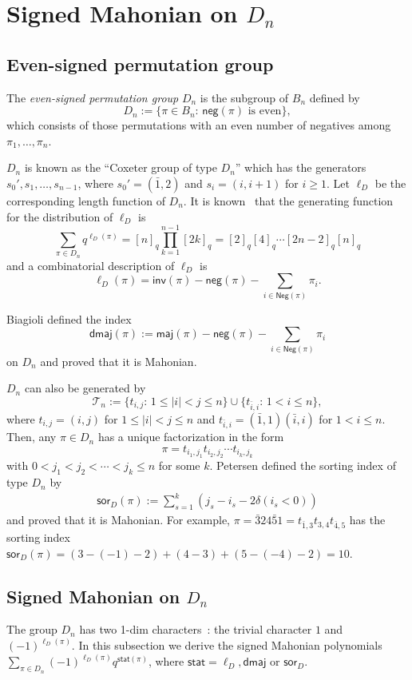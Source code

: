 \documentclass[a4paper, reqno, 11pt]{amsart}
\newcommand{\stat}{{\textsf{stat}}}
\newcommand{\maj}{{\textsf{maj}}}
\newcommand{\inv}{{\textsf{inv}}}
\newcommand{\Nega}{{\textsf{Neg}}}
\newcommand{\nega}{{\textsf{neg}}}
\newcommand{\dmaj}{{\textsf{dmaj}}}
\newcommand{\sor}{{\textsf{sor}}}
\numberwithin{equation}{section}
\begin{document}
\section{Signed Mahonian on $D_n$}\label{sec:Dn}

\subsection{Even-signed permutation group}\label{Sec:Dn_Dn}

The \emph{even-signed permutation group} $D_n$ is the subgroup of $B_n$ defined by 
$$D_n:=\{\pi\in B_n:\, \nega(\pi)\text{ is even}\},$$ 
which consists of those permutations with an even number of negatives among $\pi_1,\ldots,\pi_n$. 

$D_n$ is known as the ``Coxeter group of type $D_n$'' which has the generators $s_0',s_1,\ldots,s_{n-1}$, where $s_0'=(\bar{1},2)$ and $s_i=(i,i+1)$ for $i\geq 1$. 
Let $\ell_D$ be the corresponding length function of $D_n$. 
It is known~\cite{Bjorner_Brenti_05, Humphreys_90} that the generating function for the distribution of $\ell_D$ is
\begin{equation}\label{eq:D_equidist}
\sum_{\pi\in D_n} q^{\ell_D(\pi)}=[n]_q\prod_{k=1}^{n-1}[2k]_q=[2]_q[4]_q\cdots [2n-2]_q[n]_q
\end{equation}
and a combinatorial description of $\ell_D$ is
$$ \ell_D(\pi)=\inv(\pi)-\nega(\pi)-\sum_{i\in\Nega(\pi)}\pi_i.$$

Biagioli \cite{Biagioli_03} defined the index
$$\dmaj(\pi):=\maj(\pi)-\nega(\pi)-\sum_{i\in \Nega(\pi)}\pi_i$$
on $D_n$ and proved that it is Mahonian.

$D_n$ can also be generated by $$\mathcal{T}_n:=\{t_{i,j}:\,1\leq|i|<j\leq n\} \cup \{t_{\bar{i},i}:\,1<i\leq n\},$$ where $t_{i,j}=(i,j)$ for $1\leq|i|<j\leq n$ and $t_{\bar{i},i}=(\bar{1},1)(\bar{i},i)$ for $1<i\leq n$.
Then, any $\pi\in D_n$ has a unique factorization in the form $$\pi=t_{i_1,j_1}t_{i_2,j_2}\cdots t_{i_k,j_k}$$ with $0<j_1<j_2<\cdots<j_k\leq n$ for some $k$.
Petersen \cite{Petersen_11} defined the sorting index of type $D_n$ by
\begin{align*}
\sor_D(\pi):=\sum_{s=1}^{k} \left( j_s-i_s - 2\delta(i_s<0) \right)
\end{align*}
and proved that it is Mahonian.
For example,
$\pi=\bar{3}24\bar{5}1=t_{\bar{1},3}t_{3,4}t_{\bar{4},5}$ has the sorting index $\sor_D(\pi)= (3-(-1)-2)+ (4-3)+ (5-(-4)-2)= 10$.


\subsection{Signed Mahonian on $D_n$}\label{sec:Dn_SM}
The group $D_n$ has two 1-dim characters~\cite{Reiner_95}: the trivial character $1$ and $(-1)^{\ell_D(\pi)}$. 
In this subsection we derive the signed Mahonian polynomials $\sum_{\pi\in D_n } (-1)^{\ell_D(\pi)} q^{\stat(\pi)}$, where $\stat=\ell_D,\dmaj$ or $\sor_D$.
\end{document}
